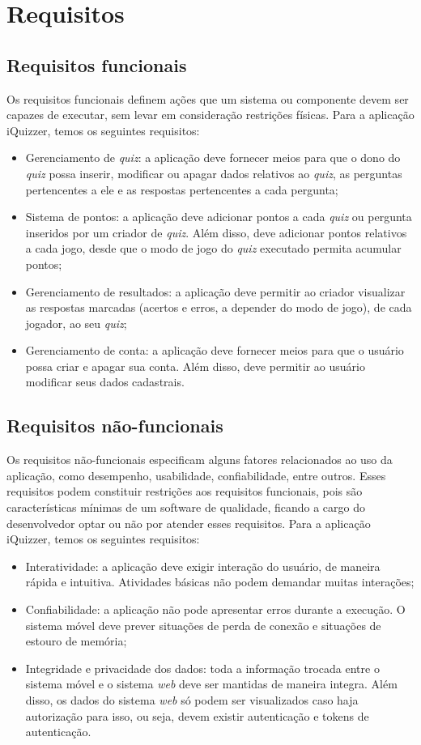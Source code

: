 \section{Requisitos}
 
\subsection{Requisitos funcionais}
Os requisitos funcionais definem ações que um sistema ou componente devem ser capazes de executar, sem levar em consideração restrições físicas. Para a aplicação iQuizzer, temos os seguintes requisitos:
\begin{itemize}
\item Gerenciamento de \emph{quiz}: a aplicação deve fornecer meios para que o dono do \emph{quiz} possa inserir, modificar ou apagar dados relativos ao \emph{quiz}, as perguntas pertencentes a ele e as respostas pertencentes a cada pergunta;
\item Sistema de pontos: a aplicação deve adicionar pontos a cada \emph{quiz} ou pergunta inseridos por um criador de \emph{quiz}. Além disso, deve adicionar pontos relativos a cada jogo, desde que o modo de jogo do \emph{quiz} executado permita acumular pontos;
\item Gerenciamento de resultados: a aplicação deve permitir ao criador visualizar as respostas marcadas (acertos e erros, a depender do modo de jogo), de cada jogador, ao seu \emph{quiz};
\item Gerenciamento de conta: a aplicação deve fornecer meios para que o usuário possa criar e apagar sua conta. Além disso, deve permitir ao usuário modificar seus dados cadastrais.
\end{itemize} 
 
\subsection{Requisitos não-funcionais}\label{SEC:RNF}
Os requisitos não-funcionais especificam alguns fatores relacionados ao uso da aplicação, como desempenho, usabilidade, confiabilidade, entre outros. Esses requisitos podem constituir restrições aos requisitos funcionais, pois são características mínimas de um software de qualidade, ficando a cargo do desenvolvedor optar ou não por atender esses requisitos.  Para a aplicação iQuizzer, temos os seguintes requisitos:
\begin{itemize}
\item Interatividade: a aplicação deve exigir interação do usuário, de maneira rápida e intuitiva. Atividades básicas não podem demandar muitas interações;
\item Confiabilidade: a aplicação não pode apresentar erros durante a execução. O sistema móvel deve prever situações de perda de conexão e situações de estouro de memória;
\item Integridade e privacidade dos dados: toda a informação trocada entre o sistema móvel e o sistema \emph{web} deve ser mantidas de maneira integra. Além disso, os dados do sistema \emph{web} só podem ser visualizados caso haja autorização para isso, ou seja, devem existir autenticação e tokens de autenticação.
\end{itemize} 
